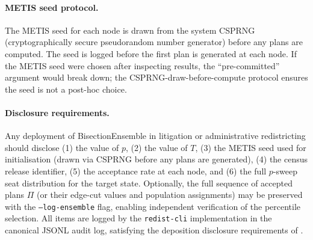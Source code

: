 \paragraph{METIS seed protocol.}
The METIS seed for each node is drawn from the system CSPRNG (cryptographically
secure pseudorandom number generator) before any plans are computed. The seed is
logged before the first plan is generated at each node. If the METIS seed were
chosen after inspecting results, the ``pre-committed'' argument would break down;
the CSPRNG-draw-before-compute protocol ensures the seed is not a post-hoc choice.

\paragraph{Disclosure requirements.}
Any deployment of BisectionEnsemble in litigation or administrative redistricting
should disclose (1) the value of $p$, (2) the value of $T$, (3) the METIS seed
used for initialisation (drawn via CSPRNG before any plans are generated),
(4) the census release identifier, (5) the acceptance rate at each node, and
(6) the full $p$-sweep seat distribution for the target state. Optionally, the
full sequence of accepted plans $\Pi$ (or their edge-cut values and population
assignments) may be preserved with the \texttt{--log-ensemble} flag, enabling
independent verification of the percentile selection. All items are logged by
the \texttt{redist-cli} implementation in the canonical JSONL audit log,
satisfying the deposition disclosure requirements of \citet{dellaLibera2026depo}.
